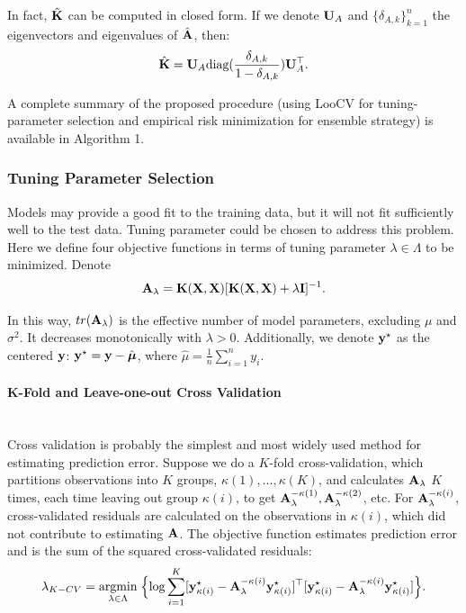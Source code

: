 \documentclass[article]{jss}
\begin{document}
In fact, $\hat{{\bf K}}$ can be computed in closed form. If we denote ${\bf U}_A$ and $\{\delta_{A,k}\}_{k=1}^n$ the eigenvectors and eigenvalues of $\hat{{\bf A}}$, then:
\begin{align*}
\hat{{\bf K}}={\bf U}_A \mbox{diag}(\frac{\delta_{A,k}}{1-\delta_{A,k}}){\bf U}_A^\top.
\end{align*}

A complete summary of the proposed procedure (using LooCV for tuning-parameter selection and empirical risk minimization for ensemble strategy) is available in Algorithm 1.


\subsubsection{{Tuning Parameter Selection}}\label{tuning}

Models may provide a good fit to the training data, but it will not fit sufficiently well to the test data. Tuning parameter could be chosen to address this problem. Here we define four objective functions in terms of tuning parameter $\lambda \in \Lambda$ to be minimized. Denote
\begin{align}
{\bf A}_\lambda={\bf K}({\bf X}, {\bf X})[{\bf K}({\bf X}, {\bf X})+\lambda {\bf I}]^{-1}.
\end{align}

In this way, $tr({\bf A}_\lambda)$ is the effective number of model parameters, excluding $\mu$ and $\sigma^2$. It decreases monotonically with $\lambda>0$. Additionally, we denote ${\bf y}^\star$ as the centered ${\bf y}$: ${\bf y}^\star={\bf y}-\hat{\boldsymbol{\mu}}$, where $\hat{\mu}=\frac{1}{n}\sum_{i=1}^ny_i$.

\paragraph{K-Fold and Leave-one-out Cross Validation}\mbox{}\\
Cross validation is probably the simplest and most widely used method for estimating prediction error. Suppose we do a $K$-fold cross-validation, which partitions observations into $K$ groups, $\kappa(1),...,\kappa(K)$, and calculates ${\bf A}_\lambda$ $K$ times, each time leaving out group $\kappa(i)$, to get ${\bf A}_\lambda^{-\kappa(1)}, {\bf A}_\lambda^{-\kappa(2)}$, etc. For ${\bf A}_\lambda^{-\kappa(i)}$, cross-validated residuals are calculated on the observations in $\kappa(i)$, which did not contribute to estimating ${\bf A}$. The objective function estimates prediction error and is the sum of the squared cross-validated residuals:
\begin{align}
\lambda_{K-CV}=\underset{\lambda \in \Lambda}{\mbox{argmin}}\;\Big\{\mbox{log} \sum_{i=1}^K[{\bf y}_{\kappa(i)}^\star-{\bf A}_\lambda^{-\kappa(i)}{\bf y}_{\kappa(i)}^\star]^\top[{\bf y}_{\kappa(i)}^\star-{\bf A}_\lambda^{-\kappa(i)}{\bf y}_{\kappa(i)}^\star]\Big\}.
\end{align}
\end{document}

